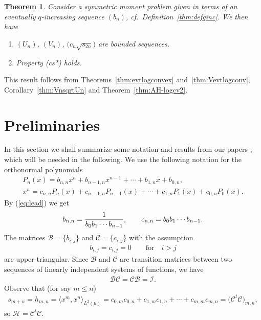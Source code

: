\documentclass[11pt]{article}
\numberwithin{equation}{section}
\newtheorem{thm}{Theorem}[section]
\begin{document}
\setcounter{section}{1}
\setcounter{subsection}{0}
\setcounter{subsubsection}{0}
\setcounter{thm}{8}
\setcounter{equation}{12}
\begin{thm}\label{thm:Main3} Consider a symmetric moment problem given in terms of an eventually $q$-increasing sequence $(b_n)$, cf.\ Definition~{\rm \ref{thm:defqinc}}. We then have
\begin{enumerate}\itemsep=0pt
\item[$(i)$] $(U_n)$, $(V_n)$, $\big(c_n\sqrt{s_{2n}}\big)$ are bounded sequences.
\item[$(ii)$] Property {\rm (cs*)} holds.
\end{enumerate}
\end{thm}

This result follows from Theorems~\ref{thm:evtlogconvex} and~\ref{thm:Vevtlogconv}, Corollary~\ref{thm:VnsqrtUn} and Theorem~\ref{thm:AH-logcv2}.

\setcounter{section}{1}
\setcounter{subsection}{0}
\setcounter{subsubsection}{0}
\setcounter{thm}{10}
\setcounter{equation}{12}
\section{Preliminaries}\label{section2}
In this section we shall summarize some notation and results from our papers \cite{B:S1,B:S2,B:S3}, which will be needed in the following. We use the following notation for the orthonormal polynomials
\begin{gather}%
P_n(x)=b_{n,n}x^n+b_{n-1,n}x^{n-1}+\cdots + b_{1,n}x+b_{0,n},\nonumber\\
x^n=c_{n,n}P_n(x)+c_{n-1,n}P_{n-1}(x)+\cdots + c_{1,n}P_1(x)+c_{0,n}P_0(x).\label{eq:x}
\end{gather}
By (\ref{eq:lead}) we get
\begin{gather}\label{eq:b_n} b_{n,n}={1\over b_0b_1\cdots b_{n-1}},\qquad c_{n,n}=b_0b_1\cdots b_{n-1}.
\end{gather}
The matrices $\mathcal B=\{b_{i,j}\}$ and $\mathcal C=\{c_{i,j}\}$ with the assumption
\begin{gather*}
b_{i,j}=c_{i,j}=0\qquad \text{for} \quad i>j
\end{gather*}
 are upper-triangular. Since $\mathcal B$ and $\mathcal C$ are transition matrices between two sequences of linearly independent systems of functions, we have
\begin{gather*}
\mathcal B\mathcal C=\mathcal C\mathcal B=\mathcal I.
\end{gather*}
Observe that (for say $m\le n$)
\begin{gather*}s_{m+n} = h_{m,n}=\big\langle x^m,x^n\big\rangle_{L^2(\mu)} = c_{0,m}c_{0,n}+c_{1,m}c_{1,n}+\cdots +c_{m,m}c_{m,n} =\big(\mathcal C^t \mathcal C\big)_{m,n},
\end{gather*}
so $\mathcal{H}=\mathcal C^t \mathcal C$.
\end{document}
